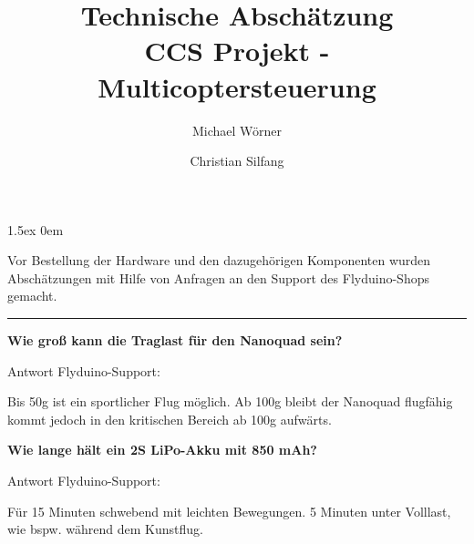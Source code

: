 \documentclass[a4paper,12pt]{article}
\begin{document}
\title{
\textbf{Technische Abschätzung}\\ 
CCS Projekt - Multicoptersteuerung
}
\author{Michael Wörner \and Christian Silfang}
\date{}

\parskip1.5ex
\parindent0em

\maketitle

Vor Bestellung der Hardware und den dazugehörigen Komponenten wurden Abschätzungen mit Hilfe von Anfragen an den Support des Flyduino-Shops gemacht.

\noindent\rule[1ex]{\textwidth}{1pt}
\vspace{1cm}

\textbf{Wie groß kann die Traglast für den Nanoquad sein?}

Antwort Flyduino-Support:

Bis 50g ist ein sportlicher Flug möglich. Ab 100g bleibt der Nanoquad flugfähig kommt jedoch in den kritischen Bereich ab 100g aufwärts.

\textbf{Wie lange hält ein 2S LiPo-Akku mit 850 mAh?} 

Antwort Flyduino-Support:

Für 15 Minuten schwebend mit leichten Bewegungen. 5 Minuten unter Volllast, wie bspw. während dem Kunstflug.
\end{document}
